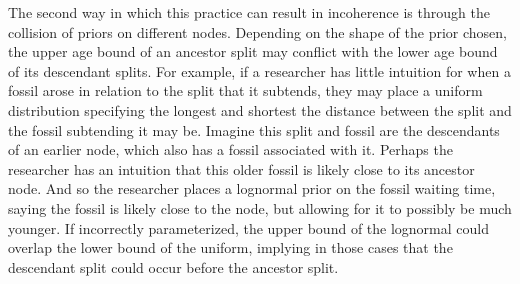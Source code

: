 \documentclass{article}
\begin{document}
The second way in which this practice can result in incoherence is through the collision of priors on different nodes.
Depending on the shape of the prior chosen,  the upper age bound of an ancestor split may conflict with the lower age bound of its descendant splits. 
For example, if a researcher has little intuition for when a fossil arose in relation to the split that it subtends, they may place a uniform distribution specifying the longest and shortest the distance between the split and the fossil subtending it may be.
Imagine this split and fossil are the descendants of an earlier node, which also has a fossil associated with it. 
Perhaps the researcher has an intuition that this older fossil is likely close to its ancestor node. 
And so the researcher places a lognormal prior on the fossil waiting time, saying the fossil is likely close to the node, but allowing for it to possibly be much younger. 
If incorrectly parameterized, the upper bound of the lognormal could overlap the lower bound of the uniform, implying in those cases that the descendant split could occur before the ancestor split.
\end{document}
